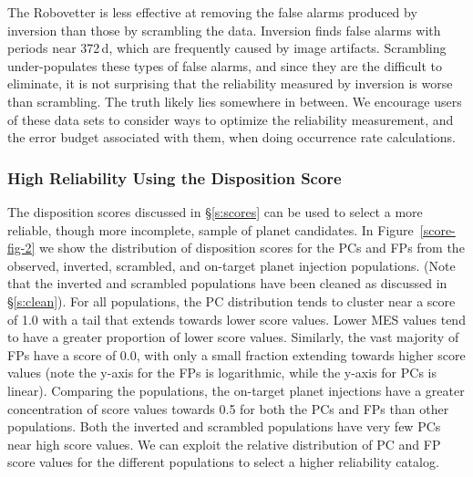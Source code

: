 The Robovetter is less effective at removing the false alarms produced by inversion than those by scrambling the data. Inversion finds false alarms with periods near 372\,d, which are frequently caused by image artifacts.  Scrambling under-populates these types of false alarms, and since they are the difficult to eliminate, it is not surprising that the reliability measured by inversion is worse than scrambling.  The truth likely lies somewhere in between. We encourage users of these data sets to consider ways to optimize the reliability measurement, and the error budget associated with them, when doing occurrence rate calculations. 




\subsubsection{High Reliability Using the Disposition Score}
\label{s:crscores}

The disposition scores discussed in \S\ref{s:scores} can be used to select a more reliable, though more incomplete, sample of planet candidates. In Figure~\ref{score-fig-2} we show the distribution of disposition scores for the PCs and FPs from the observed, inverted, scrambled, and on-target planet injection populations. (Note that the inverted and scrambled populations have been cleaned as discussed in \S\ref{s:clean}). For all populations, the PC distribution tends to cluster near a score of 1.0 with a tail that extends towards lower score values. Lower MES values tend to have a greater proportion of lower score values. Similarly, the vast majority of FPs have a score of 0.0, with only a small fraction extending towards higher score values (note the y-axis for the FPs is logarithmic, while the y-axis for PCs is linear). Comparing the populations, the on-target planet injections have a greater concentration of score values towards 0.5 for both the PCs and FPs than other populations. Both the inverted and scrambled populations have very few PCs near high score values. We can exploit the relative distribution of PC and FP score values for the different populations to select a higher reliability catalog.

